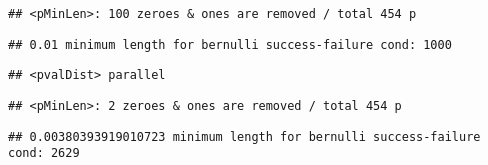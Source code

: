 \documentclass[]{article}
\newenvironment{Shaded}{\begin{snugshade}}{\end{snugshade}}
\newcommand{\DataTypeTok}[1]{\textcolor[rgb]{0.13,0.29,0.53}{#1}}
\newcommand{\DecValTok}[1]{\textcolor[rgb]{0.00,0.00,0.81}{#1}}
\newcommand{\KeywordTok}[1]{\textcolor[rgb]{0.13,0.29,0.53}{\textbf{#1}}}
\newcommand{\NormalTok}[1]{#1}
\newcommand{\OperatorTok}[1]{\textcolor[rgb]{0.81,0.36,0.00}{\textbf{#1}}}
\newcommand{\OtherTok}[1]{\textcolor[rgb]{0.56,0.35,0.01}{#1}}
\newcommand{\StringTok}[1]{\textcolor[rgb]{0.31,0.60,0.02}{#1}}
\begin{document}
\begin{verbatim}
## <pMinLen>: 100 zeroes & ones are removed / total 454 p
\end{verbatim}

\begin{verbatim}
## 0.01 minimum length for bernulli success-failure cond: 1000
\end{verbatim}

\begin{Shaded}
\end{Shaded}

\begin{verbatim}
## <pvalDist> parallel
\end{verbatim}

\begin{verbatim}
## <pMinLen>: 2 zeroes & ones are removed / total 454 p
\end{verbatim}

\begin{verbatim}
## 0.00380393919010723 minimum length for bernulli success-failure cond: 2629
\end{verbatim}
\end{document}

